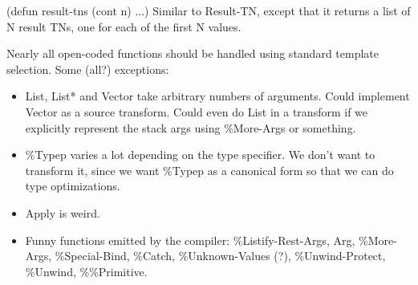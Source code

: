     (defun result-tns (cont n)
      ...)
Similar to Result-TN, except that it returns a list of N result TNs, one
for each of the first N values.


Nearly all open-coded functions should be handled using standard template
selection.  Some (all?) exceptions:
\begin{itemize}
\item List, List* and Vector take arbitrary numbers of arguments.  Could
    implement Vector as a source transform.  Could even do List in a transform
    if we explicitly represent the stack args using \%More-Args or something.
\item \%Typep varies a lot depending on the type specifier.  We don't want to
    transform it, since we want \%Typep as a canonical form so that we can do
    type optimizations.
\item Apply is weird.
\item Funny functions emitted by the compiler: \%Listify-Rest-Args, Arg,
    \%More-Args, \%Special-Bind, \%Catch, \%Unknown-Values (?), \%Unwind-Protect,
    \%Unwind, \%\%Primitive.
\end{itemize}

